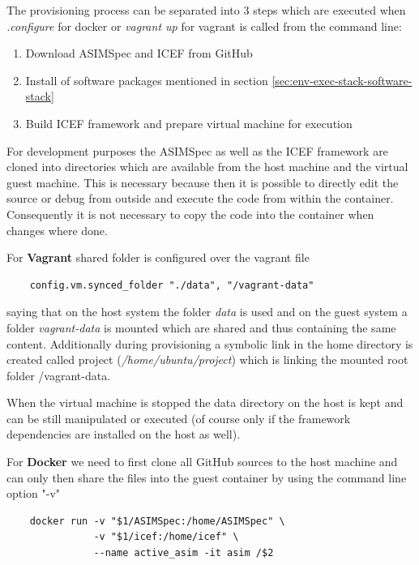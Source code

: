 The provisioning process can be separated into 3 steps which are executed when \textit{.\/configure} for docker or \textit{vagrant up} for vagrant is called from the command line:

\begin{enumerate}
	\item Download ASIMSpec and ICEF from GitHub
	\item Install of software packages mentioned in section \ref{sec:env-exec-stack-software-stack}
	\item Build ICEF framework and prepare virtual machine for execution
\end{enumerate}

For development purposes the ASIMSpec as well as the ICEF framework are cloned into directories which are available from the host machine and the virtual guest machine. This is necessary because then it is possible to directly edit the source or debug from outside and execute the code from within the container. Consequently it is not necessary to copy the code into the container when changes where done.

For \textbf{Vagrant} shared folder is configured over the vagrant file

\begin{lstlisting}
	config.vm.synced_folder "./data", "/vagrant-data"
\end{lstlisting}

saying that on the host system the folder \textit{data} is used and on the guest system a folder \textit{vagrant-data} is mounted which are shared and thus containing the same content. Additionally during provisioning a symbolic link in the home directory is created called project (\textit{/home/ubuntu/project}) which is linking the mounted root folder /vagrant-data.

When the virtual machine is stopped the data directory on the host is kept and can be still manipulated or executed (of course only if the framework dependencies are installed on the host as well).

For \textbf{Docker} we need to first clone all GitHub sources to the host machine and can only then share the files into the guest container by using the command line option "-v"

\begin{lstlisting}
	docker run -v "$1/ASIMSpec:/home/ASIMSpec" \
	           -v "$1/icef:/home/icef" \
	           --name active_asim -it asim /$2
\end{lstlisting}

